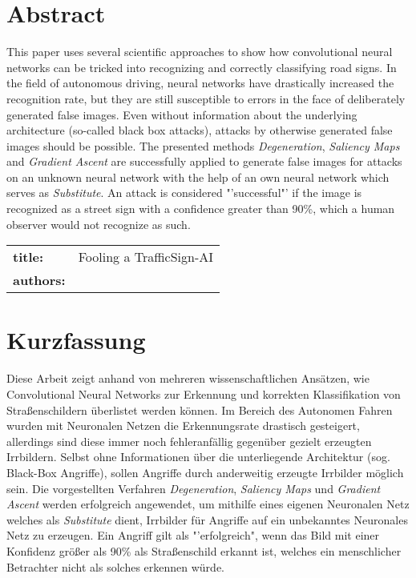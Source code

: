 \chapter*{Abstract} %
This paper uses several scientific approaches to show how convolutional neural networks can be tricked into recognizing and correctly classifying road signs.
In the field of autonomous driving, neural networks have drastically increased the recognition rate, but they are still susceptible to errors in the face of deliberately generated false images. Even without information about the underlying architecture (so-called black box attacks), attacks by otherwise generated false images should be possible.
The presented methods \textit{Degeneration}, \textit{Saliency Maps} and \textit{Gradient Ascent} are successfully applied to generate false images for attacks on an unknown neural network with the help of an own neural network which serves as \textit{Substitute}.
An attack is considered "'successful"' if the image is recognized as a street sign with a confidence greater than 90\%, which a human observer would not recognize as such.
~\newline
~\newline
\begin{flushleft}
	\begin{tabular}{lp{11cm}}
		\textbf{title:} & Fooling a TrafficSign-AI \\
		\textbf{authors:}  & \autor \\
		
	\end{tabular} 
\end{flushleft}


\chapter*{Kurzfassung} 
Diese Arbeit zeigt anhand von mehreren wissenschaftlichen Ansätzen, wie Convolutional Neural Networks zur Erkennung und korrekten Klassifikation von Straßenschildern überlistet werden können.
Im Bereich des Autonomen Fahren wurden mit Neuronalen Netzen die Erkennungsrate drastisch gesteigert, allerdings sind diese immer noch fehleranfällig gegenüber gezielt erzeugten Irrbildern. Selbst ohne Informationen über die unterliegende Architektur (sog. Black-Box Angriffe), sollen Angriffe durch anderweitig erzeugte Irrbilder möglich sein.
Die vorgestellten Verfahren \textit{Degeneration}, \textit{Saliency Maps} und \textit{Gradient Ascent} werden erfolgreich angewendet, um mithilfe eines eigenen Neuronalen Netz welches als \textit{Substitute} dient, Irrbilder für Angriffe auf ein unbekanntes Neuronales Netz zu erzeugen.
Ein Angriff gilt als "'erfolgreich", wenn das Bild mit einer Konfidenz größer als 90\% als Straßenschild erkannt ist, welches ein menschlicher Betrachter nicht als solches erkennen würde.

